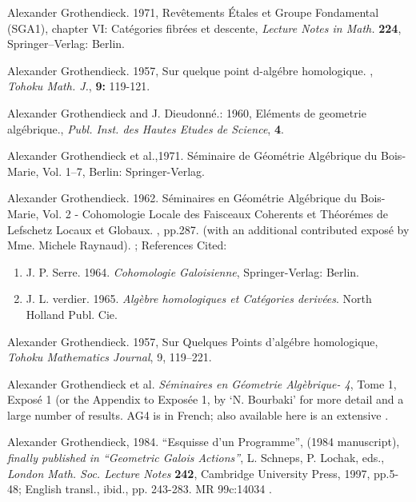 \documentclass[12pt]{article}
\theoremstyle{plain}
\theoremstyle{definition}
\numberwithin{equation}{section}
\begin{document}
\begin{thebibliography}{99}

Alexander Grothendieck. 1971, Rev\^{e}tements \'Etales et Groupe Fondamental (SGA1),
chapter VI: Cat\'egories fibr\'ees et descente, \emph{Lecture Notes in Math.}
\textbf{224}, Springer--Verlag: Berlin.

Alexander Grothendieck. 1957, Sur quelque point d-alg\'{e}bre homologique. , \emph{Tohoku Math. J.}, \textbf{9:} 119-121.

Alexander Grothendieck and J. Dieudonn\'{e}.: 1960, El\'{e}ments de geometrie alg\'{e}brique., \emph{Publ. Inst. des Hautes Etudes de Science}, \textbf{4}.

Alexander Grothendieck et al.,1971. S\'eminaire de G\'eom\'etrie Alg\'ebrique du Bois-Marie, Vol. 1--7, Berlin: Springer-Verlag.

Alexander Grothendieck. 1962. S\'eminaires en G\'eom\'etrie Alg\'ebrique du Bois-Marie, Vol. 2 - Cohomologie Locale des Faisceaux Coherents et Th\'eor\'emes de Lefschetz Locaux et Globaux. , pp.287. (with an additional contributed expos\'e by Mme. Michele Raynaud). 
;
References Cited: 
\begin{enumerate}
\item J. P. Serre. 1964. {\em Cohomologie Galoisienne}, Springer-Verlag: Berlin.
\item J. L. verdier. 1965. {\em Alg\`ebre homologiques et Cat\'egories deriv\'ees}. North Holland Publ. Cie.
\end{enumerate}

Alexander Grothendieck. 1957, Sur Quelques Points d'alg\'ebre homologique, {\em Tohoku Mathematics Journal}, 9, 119--221.
 

Alexander Grothendieck et al. \emph{S\'eminaires en G\'eometrie Alg\`ebrique- 4}, Tome 1, Expos\'e 1 
(or the Appendix to Expos\'ee 1, by `N. Bourbaki' for more detail and a large number of results.
AG4 is  in French;
also available here is an extensive 
.

Alexander Grothendieck, 1984. ``Esquisse d'un Programme'', (1984 manuscript), 
{\em finally published in ``Geometric Galois Actions''}, L. Schneps, P. Lochak, eds., 
{\em London Math. Soc. Lecture Notes} {\bf 242}, Cambridge University Press, 1997, pp.5-48;
English transl., ibid., pp. 243-283. MR 99c:14034 .


\end{thebibliography}
\end{document}
